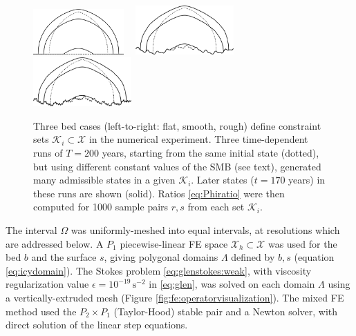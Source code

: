 \documentclass[hidelinks,onefignum,onetabnum,final]{siamart220329}  %
\newcommand{\eps}{\epsilon}
\newcommand{\cK}{\mathcal{K}}
\newcommand{\cX}{\mathcal{X}}
\begin{document}
\begin{figure}[ht]
\mbox{\includegraphics[width=0.31\textwidth]{figs/snapsflat.png} \, \includegraphics[width=0.335\textwidth]{figs/snapssmooth.png} \, \includegraphics[width=0.335\textwidth]{figs/snapsrough.png}}

\caption{Three bed cases (left-to-right: flat, smooth, rough) define constraint sets $\cK_i\subset\cX$ in the numerical experiment.  Three time-dependent runs of $T=200$ years, starting from the same initial state (dotted), but using different constant values of the SMB (see text), generated many admissible states in a given $\cK_i$.  Later states ($t=170$ years) in these runs are shown (solid).  Ratios \eqref{eq:Phiratio} were then computed for 1000 sample pairs $r,s$ from each set $\cK_i$.}
\label{fig:cases}
\end{figure}

The interval $\Omega$ was uniformly-meshed into equal intervals, at resolutions which are addressed below.  A $P_1$ piecewise-linear FE space $\cX_h\subset \cX$ was used for the bed $b$ and the surface $s$, giving polygonal domains $\Lambda$ defined by $b,s$ (equation \eqref{eq:icydomain}).  The Stokes problem \eqref{eq:glenstokes:weak}, with viscosity regularization value $\eps=10^{-19}\, \text{s}^{-2}$ in \eqref{eq:glen}, was solved on each domain $\Lambda$ using a vertically-extruded mesh (Figure \ref{fig:fe:operatorvisualization}).  The mixed FE method used the $P_2\times P_1$ (Taylor-Hood) stable pair \cite{Elmanetal2014} and a Newton solver, with direct solution of the linear step equations.
\end{document}
